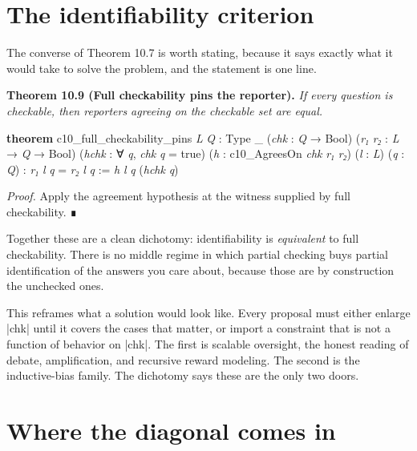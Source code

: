 \documentclass{memoir}
\begin{document}
\section{The identifiability criterion}\label{Two--Schemas--of--Impossibility-005F-005F-005F--Machine--Checked--Limits--of--Trustworthy--Machine--Learning-005F-005F-005F--and--Why--They--Tighten--with--Capability----The--Reporter--Is--Underdetermined----The--identifiability--criterion}

The converse of Theorem 10.7 is worth stating, because it says exactly what it
would take to solve the problem, and the statement is one line.

\textbf{Theorem 10.9 (Full checkability pins the reporter).} \emph{If every question is
checkable, then reporters agreeing on the checkable set are equal.}

\begin{LeanVerbatim}
\textbf{theorem} c10_full_checkability_pins \textit{L} \textit{Q} : Type _
    (\textit{chk} : \textit{Q} → Bool) (\textit{r₁} \textit{r₂} : \textit{L} → \textit{Q} → Bool)
    (\textit{hchk} : ∀ \textit{q}, \textit{chk} \textit{q} = true) (\textit{h} : c10_AgreesOn \textit{chk} \textit{r₁} \textit{r₂})
    (\textit{l} : \textit{L}) (\textit{q} : \textit{Q}) : \textit{r₁} \textit{l} \textit{q} = \textit{r₂} \textit{l} \textit{q} :=
  \textit{h} \textit{l} \textit{q} (\textit{hchk} \textit{q})

\end{LeanVerbatim}


\emph{Proof.} Apply the agreement hypothesis at the witness supplied by full
checkability. ∎

Together these are a clean dichotomy: identifiability is \emph{equivalent} to full
checkability. There is no middle regime in which partial checking buys partial
identification of the answers you care about, because those are by construction
the unchecked ones.

This reframes what a solution would look like. Every proposal must either
enlarge \LeanVerb|chk| until it covers the cases that matter, or import a constraint that
is not a function of behavior on \LeanVerb|chk|. The first is scalable oversight, the
honest reading of debate, amplification, and recursive reward modeling. The
second is the inductive-bias family. The dichotomy says these are the only two
doors.



\section{Where the diagonal comes in}\label{Two--Schemas--of--Impossibility-005F-005F-005F--Machine--Checked--Limits--of--Trustworthy--Machine--Learning-005F-005F-005F--and--Why--They--Tighten--with--Capability----The--Reporter--Is--Underdetermined----Where--the--diagonal--comes--in}
\end{document}
